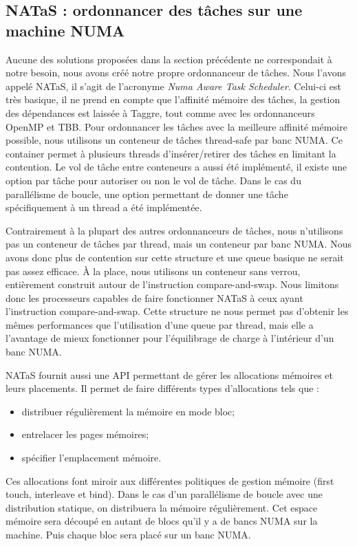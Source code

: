 \subsection{NATaS : ordonnancer des tâches sur une machine NUMA}
Aucune des solutions proposées dans la section précédente ne correspondait à notre besoin, nous avons créé notre propre ordonnanceur de tâches.
%
Nous l'avons appelé NATaS, il s'agit de l'acronyme {\em Numa Aware Task Scheduler}.
%
Celui-ci est très basique, il ne prend en compte que l'affinité mémoire des tâches, la gestion des dépendances est laissée à Taggre, tout comme avec les ordonnanceurs OpenMP et TBB.
%
Pour ordonnancer les tâches avec la meilleure affinité mémoire possible, nous utilisons un conteneur de tâches thread-safe par banc NUMA.
%
Ce container permet à plusieurs threads d'insérer/retirer des tâches en limitant la contention.
%
Le vol de tâche entre conteneurs a aussi été implémenté, il existe une option par tâche pour autoriser ou non le vol de tâche.
%
Dans le cas du parallélisme de boucle, une option permettant de donner une tâche spécifiquement à un thread a été implémentée.

Contrairement à la plupart des autres ordonnanceurs de tâches, nous n'utilisons pas un conteneur de tâches par thread, mais un conteneur par banc NUMA.
%
Nous avons donc plus de contention sur cette structure et une queue basique ne serait pas assez efficace.
%
\`A la place, nous utilisons un conteneur sans verrou, entièrement construit autour de l'instruction compare-and-swap.
%
Nous limitons donc les processeurs capables de faire fonctionner NATaS à ceux ayant l'instruction compare-and-swap.
%
Cette structure ne nous permet pas d'obtenir les mêmes performances que l'utilisation d'une queue par thread, mais elle a l'avantage de mieux fonctionner pour l'équilibrage de charge à l'intérieur d'un banc NUMA.



NATaS fournit aussi une API permettant de gérer les allocations mémoires et leurs placements.
%
Il permet de faire différents types d'allocations tels que :
\begin{itemize}
  \item distribuer régulièrement la mémoire en mode bloc;
  \item entrelacer les pages mémoires;
  \item spécifier l'emplacement mémoire.
\end{itemize}
%
Ces allocations font miroir aux différentes politiques de gestion mémoire (first touch, interleave et bind).
%
Dans le cas d'un parallélisme de boucle avec une distribution statique, on distribuera la mémoire régulièrement.
%
Cet espace mémoire sera découpé en autant de blocs qu'il y a de bancs NUMA sur la machine.
%
Puis chaque bloc sera placé sur un banc NUMA.


